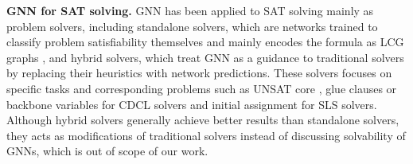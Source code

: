 \textbf{GNN for SAT solving.} GNN has been applied to SAT solving mainly as problem solvers, including standalone solvers, which are networks trained to classify problem satisfiability themselves and mainly encodes the formula as LCG graphs \cite{selsam2018learning,zhangBetterGeneralizationNeural2022,changPredictingPropositionalSatisfiability2022,shi2023satformer,cameronPredictingPropositionalSatisfiability2020,hartfordDeepModelsInteractions2018,duanAugmentCareContrastive2022,ozolinsGoalAwareNeuralSAT2022}, and hybrid solvers, which treat GNN as a guidance to traditional solvers by replacing their heuristics with network predictions. These solvers focuses on specific tasks and corresponding problems such as UNSAT core \cite{selsam2019guiding}, glue clauses \cite{hanEnhancingSATSolvers2020} or backbone variables \cite{wangNeuroBackImprovingCDCL2023} for CDCL solvers and initial assignment \cite{zhangNLocalSATBoostingLocal2020, liNSNetGeneralNeural2022} for SLS solvers. Although hybrid solvers generally achieve better results than standalone solvers, they acts as modifications of traditional solvers instead of discussing solvability of GNNs,  which is out of scope of our work.